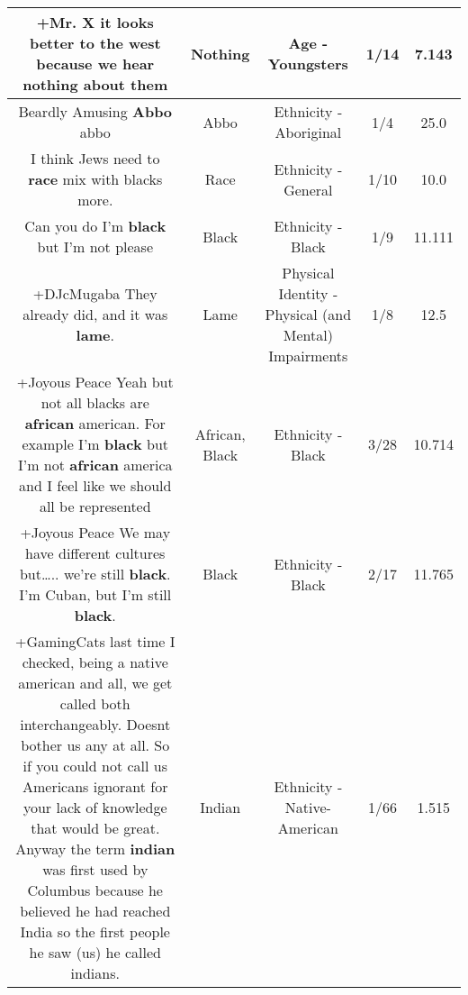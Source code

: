 \documentclass[11pt]{article}
\newlength\mylength
\begin{document}
\begin{center}
\begin{longtable}{|C{.65\mylength}|C{.30\mylength}|C{.12\mylength}|C{.12\mylength}|C{.12\mylength}|}
  \small +Mr. X it looks better to the west because we hear \textbf{nothing} about them\normalsize   & Nothing & Age - Youngsters & 1/14 & 7.143 \\  \hline
  \small Beardly Amusing \textbf{Abbo} abbo\normalsize   & Abbo & Ethnicity - Aboriginal & 1/4 & 25.0 \\  \hline
  \small I think Jews need to \textbf{race} mix with blacks more.\normalsize   & Race & Ethnicity - General & 1/10 & 10.0 \\  \hline
  \small Can you do I'm \textbf{black} but I'm not please\normalsize   & Black & Ethnicity - Black & 1/9 & 11.111 \\  \hline
  \small +DJcMugaba They already did, and it was \textbf{lame}.\normalsize   & Lame & Physical Identity - Physical (and Mental) Impairments & 1/8 & 12.5 \\  \hline
  \small +Joyous Peace Yeah but not all blacks are \textbf{african} american. For example I'm \textbf{black} but I'm not \textbf{african} america and I feel like we should all be represented\normalsize   & African, Black & Ethnicity - Black & 3/28 & 10.714 \\  \hline
  \small +Joyous Peace We may have different cultures but….. we're still \textbf{black}. I'm Cuban, but I'm still \textbf{black}.\normalsize   & Black & Ethnicity - Black & 2/17 & 11.765 \\  \hline
  \small +GamingCats last time I checked, being a native american and all, we get called both interchangeably. Doesnt bother us any at all. So if you could not call us Americans ignorant for your lack of knowledge that would be great. Anyway the term \textbf{indian} was first used by Columbus because he believed he had reached India so the first people he saw (us) he called indians.\normalsize   & Indian & Ethnicity - Native-American & 1/66 & 1.515 \\  \hline

\end{longtable}
\end{center}
\end{document}
